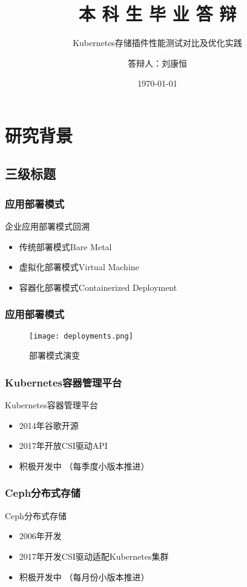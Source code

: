 \documentclass[14pt, AutoFakeBold]{ldr}
\title{本 科 生 毕 业 答 辩}
\subtitle{Kubernetes存储插件性能测试对比及优化实践}
\author{答辩人：刘康恒}
\institute{指导老师：程刚}
\date{\today}
\begin{document}
\maketitle


\section{研究背景}
\subsection{三级标题}

\begin{frame}
\frametitle{应用部署模式}
  企业应用部署模式回溯
\begin{itemize}
  \item 传统部署模式Bare Metal
  \item 虚拟化部署模式Virtual Machine
  \item 容器化部署模式Containerized Deployment
\end{itemize}
\end{frame}

\begin{frame}
  \frametitle{应用部署模式}
  \begin{figure}[H]
    \centering
    \texttt{[image: deployments.png]}
  
    \caption{部署模式演变}
    \label{deployments}
\end{figure}
\end{frame}

\begin{frame}
  \frametitle{Kubernetes容器管理平台}
  Kubernetes容器管理平台
  \begin{itemize}
    \item 2014年谷歌开源
    \item 2017年开放CSI驱动API
    \item 积极开发中 （每季度小版本推进）
  \end{itemize}
\end{frame}

\begin{frame}
  \frametitle{Ceph分布式存储}
  Ceph分布式存储
  \begin{itemize}
    \item 2006年开发
    \item 2017年开发CSI驱动适配Kubernetes集群
    \item 积极开发中 （每月份小版本推进）
  \end{itemize}
\end{frame}
\end{document}
